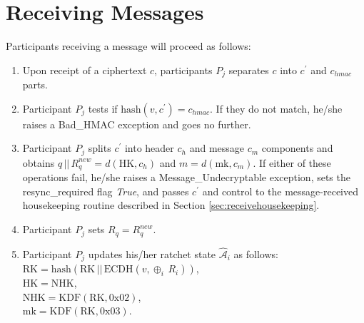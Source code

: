 \documentclass[%
preprint,
amsmath,amssymb,
aps,
prb,
floatfix,
]{revtex4-1}
\begin{document}
\section{\label{sec:receiving}Receiving Messages}
Participants receiving a message will proceed as follows:
\begin{enumerate}
\item Upon receipt of a ciphertext $c$, participants $P_j$ separates $c$ into
$c^\prime$ and $c_{hmac}$ parts.
\item Participant $P_j$ tests if $\mathrm{hash}(v, c^\prime) = c_{hmac}$. If
they do not match, he/she raises a Bad\_HMAC exception and goes no further.
\item Participant $P_j$ splits $c^\prime$ into header $c_h$ and message $c_m$ components
and obtains $q \, || \, R_q^{new} = d(\mathrm{HK}, c_h)$ and $m = d(\mathrm{mk},
c_m)$. If either of these operations fail, he/she raises a Message\_Undecryptable
exception, sets the resync\_required flag \textit{True},
and passes $c^\prime$ and control to the message-received housekeeping routine described in
Section \ref{sec:receivehousekeeping}.
\item Participant $P_j$ sets $R_q = R_q^{new}$.
\item Participant $P_j$ updates his/her ratchet state $\mathcal{\hat{A}}_i$ as
follows: \\
$\mathrm{RK} = \mathrm{hash}(\mathrm{RK} \, || \, \mathrm{ECDH}(v, \oplus_i
\, R_i))$, \\
$\mathrm{HK} = \mathrm{NHK}$, \\
$\mathrm{NHK} = \mathrm{KDF}(\mathrm{RK}, 0\mathrm{x}02)$, \\
$\mathrm{mk} = \mathrm{KDF}(\mathrm{RK}, 0\mathrm{x}03)$.

\end{enumerate}
\end{document}
